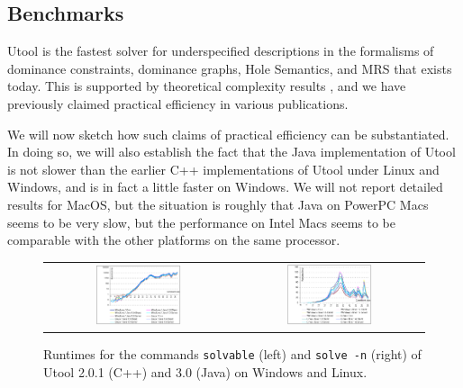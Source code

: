 \subsection{Benchmarks}

Utool is the fastest solver for underspecified descriptions in the
formalisms of dominance constraints, dominance graphs, Hole Semantics,
and MRS that exists today. This is supported by theoretical complexity
results
\cite{Althaus-J.Algo.,bodirsky-weakly-normal-constraints,KolTha05b},
and we have previously claimed practical efficiency in various
publications.

We will now sketch how such claims of practical efficiency can be
substantiated. In doing so, we will also establish the fact that the
Java implementation of Utool is not slower than the earlier C++
implementations of Utool under Linux and Windows, and is in fact a
little faster on Windows. We will not report detailed results for MacOS, but the situation is roughly that Java on PowerPC Macs seems to be very slow, but the performance on Intel Macs seems to be comparable with the other platforms on the same processor.



\begin{figure}
\centering
\begin{tabular}{cc}
\includegraphics[width=0.48\textwidth]{jh-extraction-mean.pdf}
&
\includegraphics[width=0.48\textwidth]{jh-chart-mean.pdf}
\end{tabular}
\caption{Runtimes for the commands \texttt{solvable} (left) and
\texttt{solve -n} (right) of Utool 2.0.1 (C++) and 3.0 (Java) on
Windows and Linux. \label{fig:runtimes}}
\end{figure}

